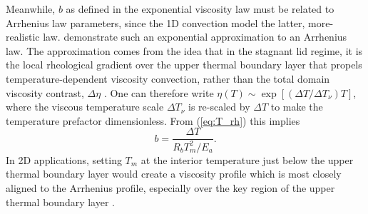 Meanwhile, $b$ as defined in the exponential viscosity law must be related to Arrhenius law parameters, since the 1D convection model the latter, more-realistic law. \citet{moresi_numerical_1995} demonstrate such an exponential approximation to an Arrhenius law. The approximation comes from the idea that in the stagnant lid regime, it is the local rheological gradient over the upper thermal boundary layer that propels temperature-dependent viscosity convection, rather than the total domain viscosity contrast, $\Delta \eta$ \citep{davaille_transient_1993}. One can therefore write $\eta(T) \sim \exp\left[\left( \Delta T / \Delta T_\nu \right) T \right]$, where the viscous temperature scale $\Delta T_\nu$ is re-scaled by $\Delta T$ to make the temperature prefactor dimensionless. From (\ref{eq:T_rh}) this implies
\begin{equation} \label{eq:b-1D}
    b = \frac{\Delta T}{R_b T_m^2 / E_a}.
\end{equation}
In 2D applications, setting $T_m$ at the interior temperature just below the upper thermal boundary layer would create a viscosity profile which is most closely aligned to the Arrhenius profile, especially over the key region of the upper thermal boundary layer \citep{moresi_numerical_1995}.


